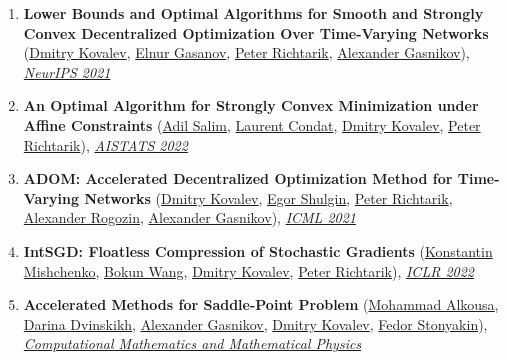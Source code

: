 \begin{enumerate}
\item \textbf{Lower Bounds and Optimal Algorithms for Smooth and Strongly Convex Decentralized Optimization Over Time-Varying Networks} (\href{https://www.dmitry-kovalev.com}{\color{linkcolour}Dmitry Kovalev}, \href{https://elnurgasanov.com}{\color{linkcolour}Elnur Gasanov}, \href{https://richtarik.org}{\color{linkcolour}Peter Richtarik}, \href{https://scholar.google.ru/citations?user=AmeE8qkAAAAJ}{\color{linkcolour}Alexander Gasnikov}), \href{https://proceedings.neurips.cc/paper/2021/hash/bc37e109d92bdc1ea71da6c919d54907-Abstract.html}{\em \color{black}NeurIPS 2021}
\item \textbf{An Optimal Algorithm for Strongly Convex Minimization under Affine Constraints} (\href{https://adil-salim.github.io}{\color{linkcolour}Adil Salim}, \href{https://lcondat.github.io}{\color{linkcolour}Laurent Condat}, \href{https://www.dmitry-kovalev.com}{\color{linkcolour}Dmitry Kovalev}, \href{https://richtarik.org}{\color{linkcolour}Peter Richtarik}), \href{http://aistats.org/aistats2022/accepted.html}{\em \color{black}AISTATS 2022}
\item \textbf{ADOM: Accelerated Decentralized Optimization Method for Time-Varying Networks} (\href{https://www.dmitry-kovalev.com}{\color{linkcolour}Dmitry Kovalev}, \href{https://shulgin-egor.github.io}{\color{linkcolour}Egor Shulgin}, \href{https://richtarik.org}{\color{linkcolour}Peter Richtarik}, \href{https://scholar.google.com/citations?user=sEjyzkgAAAAJ}{\color{linkcolour}Alexander Rogozin}, \href{https://scholar.google.ru/citations?user=AmeE8qkAAAAJ}{\color{linkcolour}Alexander Gasnikov}), \href{http://proceedings.mlr.press/v139/kovalev21a}{\em \color{black}ICML 2021}
\item \textbf{IntSGD: Floatless Compression of Stochastic Gradients} (\href{https://konstmish.github.io}{\color{linkcolour}Konstantin Mishchenko}, \href{https://bokunwang1.github.io}{\color{linkcolour}Bokun Wang}, \href{https://www.dmitry-kovalev.com}{\color{linkcolour}Dmitry Kovalev}, \href{https://richtarik.org}{\color{linkcolour}Peter Richtarik}), \href{https://openreview.net/forum?id=pFyXqxChZc}{\em \color{black}ICLR 2022}
\item \textbf{Accelerated Methods for Saddle-Point Problem} (\href{https://scholar.google.com/citations?user=dJgWojUAAAAJ}{\color{linkcolour}Mohammad Alkousa}, \href{https://scholar.google.com/citations?user=5ILnTRsAAAAJ}{\color{linkcolour}Darina Dvinskikh}, \href{https://scholar.google.ru/citations?user=AmeE8qkAAAAJ}{\color{linkcolour}Alexander Gasnikov}, \href{https://www.dmitry-kovalev.com}{\color{linkcolour}Dmitry Kovalev}, \href{https://www.researchgate.net/profile/Fedor_Stonyakin}{\color{linkcolour}Fedor Stonyakin}), \href{https://link.springer.com/article/10.1134/S0965542520110020}{\em \color{black}Computational Mathematics and Mathematical Physics}

\end{enumerate}
